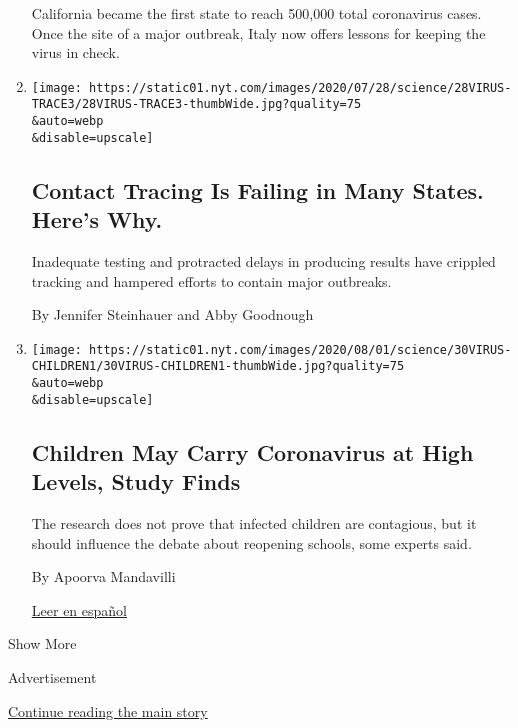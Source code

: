 \begin{enumerate}
  California became the first state to reach 500,000 total coronavirus
  cases. Once the site of a major outbreak, Italy now offers lessons for
  keeping the virus in check.
\item
  \href{/2020/07/31/health/covid-contact-tracing-tests.html}{}

  \texttt{[image: https://static01.nyt.com/images/2020/07/28/science/28VIRUS-TRACE3/28VIRUS-TRACE3-thumbWide.jpg?quality=75\\\&auto=webp\\\&disable=upscale]}

  \hypertarget{contact-tracing-is-failing-in-many-states-heres-why}{%
  \subsection{Contact Tracing Is Failing in Many States. Here's
  Why.}\label{contact-tracing-is-failing-in-many-states-heres-why}}

  Inadequate testing and protracted delays in producing results have
  crippled tracking and hampered efforts to contain major outbreaks.

  By Jennifer Steinhauer and Abby Goodnough
\item
  \href{/2020/07/30/health/coronavirus-children.html}{}

  \texttt{[image: https://static01.nyt.com/images/2020/08/01/science/30VIRUS-CHILDREN1/30VIRUS-CHILDREN1-thumbWide.jpg?quality=75\\\&auto=webp\\\&disable=upscale]}

  \hypertarget{children-may-carry-coronavirus-at-high-levels-study-finds}{%
  \subsection{Children May Carry Coronavirus at High Levels, Study
  Finds}\label{children-may-carry-coronavirus-at-high-levels-study-finds}}

  The research does not prove that infected children are contagious, but
  it should influence the debate about reopening schools, some experts
  said.

  By Apoorva Mandavilli

  \href{https://www.nytimes.com/es/2020/07/31/espanol/ciencia-y-tecnologia/ninos-contagio-coronavirus.html}{Leer
  en español}
\end{enumerate}

Show More

Advertisement

\protect\hyperlink{after-mid2}{Continue reading the main story}

